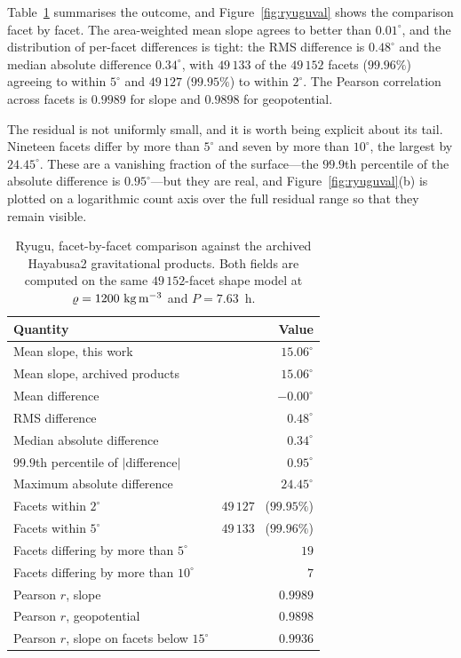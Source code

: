Table~\ref{tab:ryugu} summarises the outcome, and
Figure~\ref{fig:ryuguval} shows the comparison facet by facet. The area-weighted mean slope
agrees to better than $0.01^{\circ}$, and the distribution of per-facet
differences is tight: the RMS difference is $0.48^{\circ}$ and the median
absolute difference $0.34^{\circ}$, with $49\,133$ of the $49\,152$ facets
($99.96\%$) agreeing to within $5^{\circ}$ and $49\,127$ ($99.95\%$) to within
$2^{\circ}$. The Pearson correlation across facets is $0.9989$ for slope and
$0.9898$ for geopotential.

The residual is not uniformly small, and it is worth being explicit about its
tail. Nineteen facets differ by more than $5^{\circ}$ and seven by more than
$10^{\circ}$, the largest by $24.45^{\circ}$. These are a vanishing fraction of
the surface---the $99.9$th percentile of the absolute difference is
$0.95^{\circ}$---but they are real, and Figure~\ref{fig:ryuguval}(b) is plotted
on a logarithmic count axis over the full residual range so that they remain
visible.

\begin{table}[t]
\centering
\small
\caption{Ryugu, facet-by-facet comparison against the archived Hayabusa2
gravitational products. Both fields are computed on the same $49\,152$-facet
shape model at $\dens=1200\ \mathrm{kg\,m^{-3}}$ and $P=7.63$~h.}
\label{tab:ryugu}
\begin{tabular}{lr}
\toprule
Quantity & Value \\
\midrule
Mean slope, this work                       & $15.06^{\circ}$ \\
Mean slope, archived products               & $15.06^{\circ}$ \\
Mean difference                             & $-0.00^{\circ}$ \\
RMS difference                              & $0.48^{\circ}$ \\
Median absolute difference                  & $0.34^{\circ}$ \\
$99.9$th percentile of $\lvert$difference$\rvert$ & $0.95^{\circ}$ \\
Maximum absolute difference                 & $24.45^{\circ}$ \\
Facets within $2^{\circ}$                   & $49\,127$ \ ($99.95\%$) \\
Facets within $5^{\circ}$                   & $49\,133$ \ ($99.96\%$) \\
Facets differing by more than $5^{\circ}$   & $19$ \\
Facets differing by more than $10^{\circ}$  & $7$ \\
Pearson $r$, slope                          & $0.9989$ \\
Pearson $r$, geopotential                   & $0.9898$ \\
Pearson $r$, slope on facets below $15^{\circ}$ & $0.9936$ \\
\bottomrule
\end{tabular}
\end{table}

